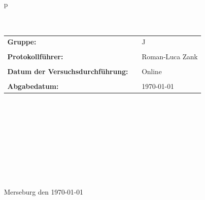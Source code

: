 \begin{center}
\begin{tabular}{p{\textwidth}}
\\ \\ \\

\begin{center}
\begin{tabular}{lll}
\large{\textbf{Gruppe:}} & & \large{J}\\
&&\\
\large{\textbf{Protokollführer:}} & & \large{Roman-Luca Zank}\\
&&\\
\large{\textbf{Datum der Versuchsdurchführung:}}&& \large{Online}\\
&&\\
\large{\textbf{Abgabedatum:}}&& \large{\today}
\end{tabular}
\end{center}

\\ \\ \\ \\ \\ \\ \\ \\ \\
\large{Merseburg den \today}

\end{tabular}
\end{center}
